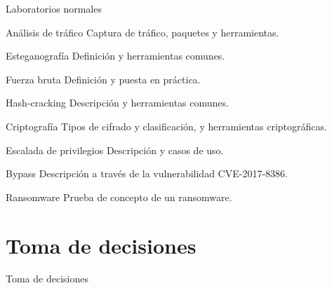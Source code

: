     \begin{frame}{Laboratorios normales}
        \begin{block}{Análisis de tráfico}
            Captura de tráfico, paquetes y herramientas.
        \end{block}

        \begin{block}{Esteganografía}
            Definición y herramientas comunes.
        \end{block}

        \begin{block}{Fuerza bruta}
            Definición y puesta en práctica.
        \end{block}

        \begin{block}{Hash-cracking}
            Descripción y herramientas comunes.
        \end{block}
    \end{frame}
    
    \begin{frame}
        \begin{block}{Criptografía}
            Tipos de cifrado y clasificación, y herramientas criptográficas.
        \end{block}

        \begin{block}{Escalada de privilegios}
            Descripción y casos de uso.
        \end{block}

        \begin{block}{Bypass}
            Descripción a través de la vulnerabilidad CVE-2017-8386.
        \end{block}

        \begin{block}{Ransomware}
            Prueba de concepto de un ransomware.
        \end{block}
    \end{frame}
    

\section{Toma de decisiones}

    \begin{frame}
        \Huge{\centerline{Toma de decisiones}}
    \end{frame}

